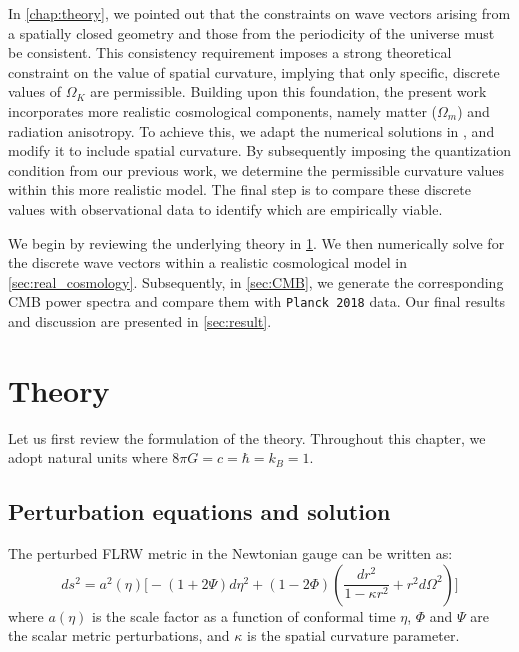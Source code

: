 In \cref{chap:theory}, we pointed out that the constraints on wave vectors arising from a spatially closed geometry and those from the periodicity of the universe must be consistent. This consistency requirement imposes a strong theoretical constraint on the value of spatial curvature, implying that only specific, discrete values of $\Omega_K$ are permissible. Building upon this foundation, the present work incorporates more realistic cosmological components, namely matter ($\Omega_m$) and radiation anisotropy. To achieve this, we adapt the numerical solutions in \cite{2022PhRvD.105l3508P}, and modify it to include spatial curvature. By subsequently imposing the quantization condition from our previous work, we determine the permissible curvature values within this more realistic model. The final step is to compare these discrete values with observational data to identify which are empirically viable.

We begin by reviewing the underlying theory in \cref{sec:theory}. We then numerically solve for the discrete wave vectors within a realistic cosmological model in \cref{sec:real_cosmology}. Subsequently, in \cref{sec:CMB}, we generate the corresponding CMB power spectra and compare them with \texttt{Planck 2018} data. Our final results and discussion are presented in \cref{sec:result}. %

\section{Theory}\label{sec:theory}

Let us first review the formulation of the theory. Throughout this chapter, we adopt natural units where $8\pi G=c=\hbar=k_B=1$. 

\subsection{Perturbation equations and solution} %

The perturbed FLRW metric in the Newtonian gauge can be written as: %
\begin{equation}
    \label{eq:metric}
    ds^2 = a^2(\eta)\bigl[-(1 + 2\Psi)d\eta^2
    + (1 - 2\Phi)\left(\frac{dr^2}{1-\kappa r^2}+r^2d\Omega^2\right)\bigr]
\end{equation}
where $a(\eta)$ is the scale factor as a function of conformal time $\eta$, $\Phi$ and $\Psi$ are the scalar metric perturbations, and $\kappa$ is the spatial curvature parameter.  %

